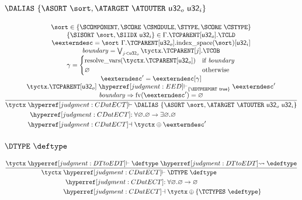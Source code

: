 \subsubsection{$\DALIAS~\{ \ASORT~\sort, \ATARGET~\ATOUTER~\u32_o~\u32_i \}$}
\[
  \frac{
    \begin{array}{@{}c@{}}
      \sort \in \{ \SCOMPONENT, \SCORE~\CSMODULE, \STYPE, \SCORE~\CSTYPE \}\\
      \{\SISORT~\sort, \SIIDX~\u32_i\} \in \Gamma.\TCPARENT[\u32_o].\TCLD\\
      \eexterndesc = \sort~\Gamma.\TCPARENT[\u32_o].\F{index\_space}(\sort)[\u32_i]\\
      \mathit{boundary} = \bigvee_{j<\u32_o} \tyctx.\TCPARENT[j].\TCOB\\
      \subst = \begin{cases}\resolveVars{\tyctx.\TCPARENT[\u32_o]} & \text{if } \mathit{boundary}\\\varnothing&\text{otherwise}\end{cases}\\
      \eexterndesc' = \eexterndesc[\subst]\\
      \tyctx.\TCPARENT[\u32_o] \vdashh!EED!_{\{\EDTPEXPORT~\true\}} \eexterndesc'\\
      \mathit{boundary} \Rightarrow \freeVars{\eexterndesc'} = \varnothing\\
    \end{array}
  }{
    \begin{aligned}
    \tyctx \vdashh!CDatECT!{}& \DALIAS~\{ \ASORT~\sort, \ATARGET~\ATOUTER~\u32_o~\u32_i \}\\
    \trelh!CDatECT!{}&\forall\varnothing.\varnothing \to \exists\varnothing.\varnothing\\
    \dashvh!CDatECT!{}&\tyctx \oplus \eexterndesc'\\
    \end{aligned}
  }
\]

\subsubsection{$\DTYPE~\deftype$}
\[
  \frac{
    \tyctx \vdashh!DTtoEDT! \deftype \leadstoh!DTtoEDT! \edeftype\\
  }{
    \begin{aligned}
    \tyctx \vdashh!CDatECT!{}&\DTYPE~\deftype\\
    \trelh!CDatECT!{}&\forall\varnothing.\varnothing \to \varnothing\\
    \dashvh!CDatECT!{}&\tyctx \oplus \{ \TCTYPES~\edeftype \}\\
    \end{aligned}
  }
\]

